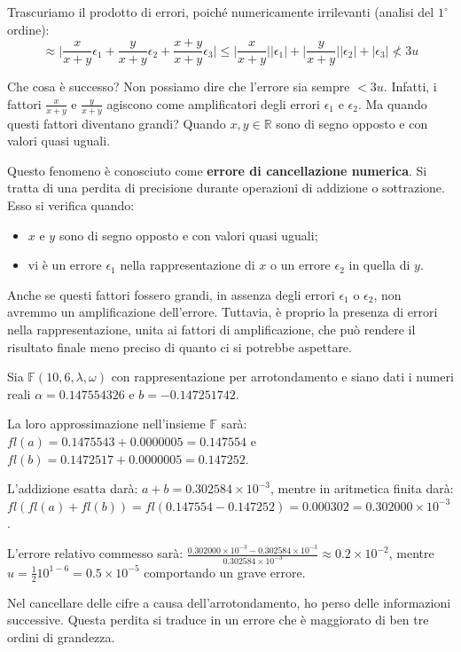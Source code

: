 \documentclass{article}
\begin{document}
\begin{itemize}
        Trascuriamo il prodotto di errori, poiché numericamente irrilevanti
        (analisi del $1^{\circ}$ ordine):
        $$\approx \Big\lvert
        \frac{x}{x+y}\epsilon_1+\frac{y}{x+y}\epsilon_2+\frac{x+y}{x+y}\epsilon_3\Big\rvert\leq
        \Big\lvert \frac{x}{x+y}\Big\rvert\lvert \epsilon_1\rvert+\Big\lvert
        \frac{y}{x+y}\Big\rvert \lvert \epsilon_2\rvert+\lvert
        \epsilon_3\rvert\nless 3u$$

        Che cosa è successo? Non possiamo dire che l'errore sia sempre $<3u$.
        Infatti, i fattori $\frac{x}{x+y}$ e $\frac{y}{x+y}$ agiscono come
        amplificatori degli errori $\epsilon_1$ e $\epsilon_2$. Ma quando questi fattori diventano grandi?
        Quando $x,y\in \mathbb{R}$ sono di segno opposto e con valori quasi
        uguali. 

        Questo fenomeno è conosciuto come \textbf{errore di
        cancellazione numerica}. Si tratta di una perdita di
        precisione durante operazioni di addizione o sottrazione. Esso si
        verifica quando:
        \begin{itemize}
            \item $x$ e $y$ sono di segno opposto e con valori quasi uguali;
            \item vi è un errore $\epsilon_1$ nella rappresentazione di $x$ o
                un errore $\epsilon_2$ in quella di $y$.
        \end{itemize}
        Anche se questi fattori fossero grandi, in assenza degli
        errori $\epsilon_1$ o $\epsilon_2$, non avremmo un amplificazione
        dell'errore. Tuttavia, è proprio la presenza di errori nella
        rappresentazione, unita ai fattori di amplificazione, che può
        rendere il risultato finale meno preciso di quanto ci si potrebbe
        aspettare.
\end{itemize}
\begin{example}
   Sia $\mathbb{F}(10,6,\lambda,\omega)$ con rappresentazione per arrotondamento e siano
   dati i numeri reali $\alpha=0.147554326$ e $b=-0.147251742$. 

   La loro approssimazione nell'insieme $\mathbb{F}$ sarà:
   $fl(a)=0.1475543+0.0000005=0.147554$ e
   $fl(b)=0.1472517+0.0000005=0.147252$.

   L'addizione esatta darà: $a+b=0.302584\times10^{-3}$, mentre in aritmetica
   finita darà:
   $fl(fl(a)+fl(b))=fl(0.147554-0.147252)=0.000302=0.302000\times10^{-3}$.

   L'errore relativo commesso sarà:
   $\frac{0.302000\times10^{-3}-0.302584\times10^{-3}}{0.302584\times10^{-3}}\approx0.2\times10^{-2}$,
   mentre $u=\frac{1}{2}10^{1-6}=0.5\times10^{-5}$ comportando un grave
   errore.

   Nel cancellare delle cifre a causa dell'arrotondamento, ho perso
   delle informazioni successive. Questa perdita si traduce in un errore che è
   maggiorato di ben tre ordini di grandezza. 
\end{example}
\end{document}
